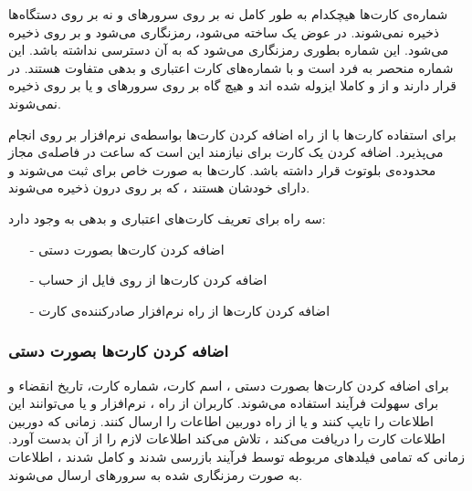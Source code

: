 \documentclass[oneside]{report}
\begin{document}
   شماره‌ی کارت‌ها هیچکدام به طور کامل نه بر روی سرور‌های 
      	{\normalsize {}} 
      	و نه بر روی دستگاه‌ها ذخیره نمی‌شوند. در عوض یک 
      	   	{\normalsize {}}
    ساخته می‌شود، رمزنگاری می‌شود و بر روی 
       	{\normalsize {}}
       	ذخیره می‌شود. این شماره بطوری رمزنگاری می‌شود که 
       	   	{\normalsize {}} به آن دسترسی نداشته باشد.
       	   	 این شماره منحصر به فرد است و با شماره‌های کارت اعتباری و بدهی متفاوت هستند. 
       	   	        	   	{\normalsize {}}
 در 
       	   	        	   	       	{\normalsize {}}
   قرار دارند و از 
          	{\normalsize {}}
          	و 
          	       	{\normalsize {}}
 کاملا ایزوله شده اند  و هیچ گاه بر روی سرورهای 
        	{\normalsize {}}
        	و یا بر روی 
        	       	{\normalsize {}}
        	       	ذخیره نمی‌شوند.        	        	    	   	        	   	 
        	       	
برای استفاده کارت‌ها با 
       	{\normalsize {}}
   از راه اضافه کردن کارت‌ها بواسطه‌ی نرم‌افزار 
          	{\normalsize {}}
          	بر روی 
          	       	{\normalsize \lr{iPhone]}}
انجام می‌پذیرد. اضافه کردن یک کارت برای 
       	{\normalsize {}} 
       	نیازمند این است که ساعت در فاصله‌ی مجاز محدوده‌ی بلوتوث قرار داشته باشد. کارت‌ها به صورت خاص برای 
       	       	{\normalsize {}} 
 ثبت می‌شوند و دارای 
          	   	        	   	{\normalsize {}}    	       	
       	خودشان هستند ، که بر روی 
       	{\normalsize {}}  
       	درون 
       	{\normalsize {}}
       	ذخیره می‌شوند.
       	
       	سه راه برای تعریف کارت‌های اعتباری و بدهی به 
       	{\normalsize {}}
       	وجود دارد: 
       \begin{itemize}
       	\item[-] اضافه کردن کارت‌ها بصورت دستی
       	\item[-] اضافه کردن کارت‌ها از روی فایل از حساب {\normalsize {}} 
       	\item[-] اضافه کردن کارت‌ها از راه نرم‌افزار صادرکننده‌ی کارت
       \end{itemize}

\subsubsection{اضافه کردن کارت‌ها بصورت دستی}
برای اضافه کردن کارت‌ها بصورت دستی ، اسم کارت، شماره کارت، تاریخ انقضاء و 
{\normalsize {}} 
برای سهولت فرآیند استفاده می‌شوند. کاربران از راه 
{\normalsize {}} 
، نرم‌افزار
{\normalsize {}}
و یا 
{\normalsize {}} 
می‌توانند این اطلاعات را تایپ کنند و یا از راه دوربین
{\normalsize {}} 
اطاعات را ارسال کنند.
زمانی که دوربین اطلاعات کارت را دریافت می‌کند ، 
{\normalsize {}}
تلاش می‌کند اطلاعات لازم را از آن بدست آورد. زمانی که تمامی فیلد‌های مربوطه  توسط فرآیند 
{\normalsize {}}
بازرسی شدند و 
کامل شدند ، اطلاعات به صورت رمزنگاری شده به سرور‌های 
{\normalsize {}} ارسال می‌شوند.
\end{document}
